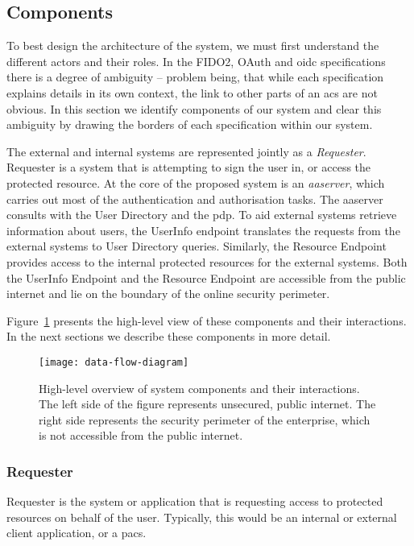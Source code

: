 \subsection{Components}
To best design the architecture of the system, we must first understand the different actors and their roles. In the FIDO2, OAuth and \acrshort{oidc} specifications there is a degree of ambiguity -- problem being, that while each specification explains details in its own context, the link to other parts of an \acrshort{acs} are not obvious. In this section we identify components of our system and clear this ambiguity by drawing the borders of each specification within our system.

The external and internal systems are represented jointly as a \textit{Requester}. Requester is a system that is attempting to sign the user in, or access the protected resource. At the core of the proposed system is an \textit{\acrfull{aaserver}}, which carries out most of the authentication and authorisation tasks. The \acrshort{aaserver} consults with the User Directory and the  \acrfull{pdp}. To aid external systems retrieve information about users, the UserInfo endpoint translates the requests from the external systems to User Directory queries. Similarly, the Resource Endpoint provides access to the internal protected resources for the external systems. Both the UserInfo Endpoint and the Resource Endpoint are accessible from the public internet and lie on the boundary of the online security perimeter.

Figure~\ref{fig:data-flow-diagram} presents the high-level view of these components and their interactions. In the next sections we describe these components in more detail.

\begin{figure}[ht]
    \centering
    \texttt{[image: data-flow-diagram]}
    \caption{High-level overview of system components and their interactions. The left side of the figure represents unsecured, public internet. The right side represents the security perimeter of the enterprise, which is not accessible from the public internet.}
    \label{fig:data-flow-diagram}
\end{figure}

\subsubsection{Requester} 
Requester is the system or application that is requesting access to protected resources on behalf of the user. Typically, this would be an internal or external client application, or a \acrshort{pacs}.

